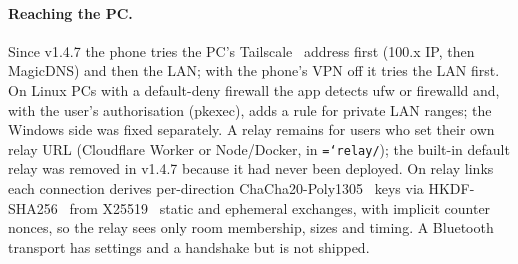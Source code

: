 \documentclass[11pt]{article}
\newcommand{\code}[1]{\texttt{\hyphenchar\font=`\-\relax #1}}
\begin{document}
\paragraph{Reaching the PC.} Since v1.4.7 the phone tries the PC's Tailscale~\citep{tailscale} address first (100.x IP, then MagicDNS) and then the LAN;
with the phone's VPN off it tries the LAN first. On Linux PCs with a default-deny firewall the app detects ufw or firewalld and, with the user's
authorisation (pkexec), adds a rule for private LAN ranges; the Windows side was fixed separately. A relay remains for users who set their own relay URL (Cloudflare Worker or Node/Docker, in \code{relay/}); the built-in default relay was removed in v1.4.7
because it had never been deployed. On relay links each connection derives per-direction ChaCha20-Poly1305~\citep{rfc8439} keys via HKDF-SHA256~\citep{rfc5869}
from X25519~\citep{rfc7748} static and ephemeral exchanges, with implicit counter nonces, so the relay sees only room membership, sizes and timing.
A Bluetooth transport has settings and a handshake but is not shipped.
\end{document}
